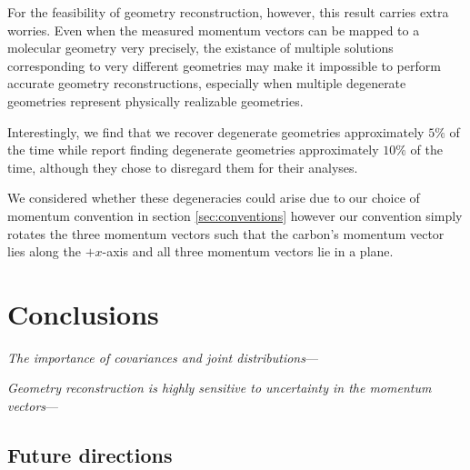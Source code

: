For the feasibility of geometry reconstruction, however, this result carries extra worries. Even when the measured momentum vectors can be mapped to a molecular geometry very precisely, the existance of multiple solutions corresponding to very different geometries may make it impossible to perform accurate geometry reconstructions, especially when multiple degenerate geometries represent physically realizable geometries.

Interestingly, we find that we recover degenerate geometries approximately $5\%$ of the time while \citet[supplementary information]{Kunitski15} report finding degenerate geometries approximately $10\%$ of the time, although they chose to disregard them for their analyses.

We considered whether these degeneracies could arise due to our choice of momentum convention in section \ref{sec:conventions} however our convention simply rotates the three momentum vectors such that the carbon's momentum vector lies along the $+x$-axis and all three momentum vectors lie in a plane.

\section{Conclusions}
\emph{The importance of covariances and joint distributions}---

\emph{Geometry reconstruction is highly sensitive to uncertainty in the momentum vectors}---

\subsection{Future directions}